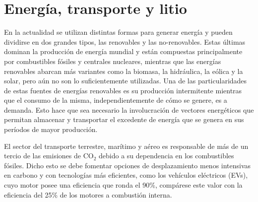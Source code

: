 \section{Energía, transporte y litio}

En la actualidad se utilizan distintas formas para generar energía y pueden 
dividirse en dos grandes tipos, las renovables y las no-renovables. Estas últimas
dominan la producción de energía mundial y están compuestas principalmente por 
combustibles fósiles y centrales nucleares, mientras que las energías renovables
abarcan más variantes como la biomasa, la hidráulica, la eólica y la solar, pero 
aún no son lo suficientemente utilizadas. Una de las particularidades de estas 
fuentes de energías renovables es su producción intermitente mientras que el 
consumo de la misma, independientemente de cómo se genere, es a demanda. Esto 
hace que sea necesario la involucración de vectores energéticos que permitan 
almacenar y transportar el excedente de energía que se genera en sus períodos de 
mayor producción.

El sector del transporte terrestre, marítimo y aéreo es responsable de más de un 
tercio de las emisiones de CO$_2$ debido a su dependencia en los combustibles 
fósiles. Dicho esto se debe fomentar opciones de desplazamiento menos intensivas
en carbono y con tecnologías más eficientes, como los vehículos eléctricos (EVs),
cuyo motor posee una eficiencia que ronda el 90\%, compárese este valor con la
eficiencia del 25\% de los motores a combustión interna.

